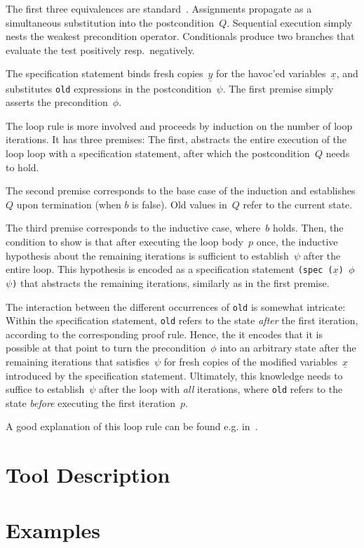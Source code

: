 \documentclass[fleqn]{llncs}
\newcommand{\code}[1]{\texttt{#1}}
\newcommand{\xs}{\underline x}
\newcommand{\ys}{\underline y}
\begin{document}
The first three equivalences are standard~\cite{}.
Assignments propagate as a simultaneous substitution into the postcondition~$Q$.
Sequential execution simply nests the weakest precondition operator.
Conditionals produce two branches that evaluate the test positively resp.~negatively.

The specification statement binds fresh copies~$\ys$ for the havoc'ed variables~$\xs$,
and substitutes \code{old} expressions in the postcondition~$\psi$.
The first premise simply asserts the precondition~$\phi$.

\medskip

The loop rule is more involved and proceeds by induction on the number of loop iterations.
It has three premises:
The first, abstracts the entire execution of the loop loop with a specification statement,
after which the postcondition~$Q$ needs to hold.

The second premise corresponds to the base case of the induction
and establishes $Q$ upon termination (when $b$ is false).
Old values in~$Q$ refer to the current state.

The third premise corresponds to the inductive case, where~$b$ holds.
Then, the condition to show is that after executing the loop body~$p$ once,
the inductive hypothesis about the remaining iterations is sufficient to establish~$\psi$ after the entire loop.
This hypothesis is encoded as a specification statement
\code{(spec ($\xs$) $\phi$ $\psi$)}
that abstracts the remaining iterations, similarly as in the first premise.

The interaction between the different occurrences of \code{old} is somewhat intricate:
Within the specification statement, \code{old} refers to the state \emph{after} the first iteration,
according to the corresponding proof rule.
Hence, the it encodes that it is possible at that point to turn the precondition~$\phi$
into an arbitrary state after the remaining iterations that satisfies~$\psi$ for fresh copies of the modified variables~$\xs$
introduced by the specification statement.
Ultimately, this knowledge needs to suffice to establish~$\psi$ after the loop with \emph{all} iterations,
where \code{old} refers to the state \emph{before} executing the first iteration~$p$.

A good explanation of this loop rule can be found e.g. in~\cite{}.

\section{Tool Description}
\label{sec:tool}

\section{Examples}
\end{document}
